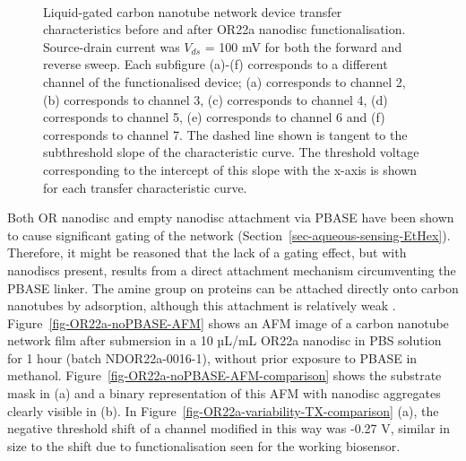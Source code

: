 \documentclass[
  a4paper,
]{scrbook}
\begin{document}
\begin{figure}
\begin{minipage}[t]{0.45\linewidth}
{{}

}

\end{minipage}%
%
\begin{minipage}[t]{0.01\linewidth}

{\centering 

~

}

\end{minipage}%

\caption{\label{fig-OR22a-variability-TX}Liquid-gated carbon nanotube
network device transfer characteristics before and after OR22a nanodisc
functionalisation. Source-drain current was \(V_{ds}\) = 100 mV for both
the forward and reverse sweep. Each subfigure (a)-(f) corresponds to a
different channel of the functionalised device; (a) corresponds to
channel 2, (b) corresponds to channel 3, (c) corresponds to channel 4,
(d) corresponds to channel 5, (e) corresponds to channel 6 and (f)
corresponds to channel 7. The dashed line shown is tangent to the
subthreshold slope of the characteristic curve. The threshold voltage
corresponding to the intercept of this slope with the x-axis is shown
for each transfer characteristic curve.}

\end{figure}

Both OR nanodisc and empty nanodisc attachment via PBASE have been shown
to cause significant gating of the network
(Section~\ref{sec-aqueous-sensing-EtHex}). Therefore, it might be
reasoned that the lack of a gating effect, but with nanodiscs present,
results from a direct attachment mechanism circumventing the PBASE
linker. The amine group on proteins can be attached directly onto carbon
nanotubes by adsorption, although this attachment is relatively weak
\autocite{Bradley2004}. Figure~\ref{fig-OR22a-noPBASE-AFM} shows an AFM
image of a carbon nanotube network film after submersion in a 10 µL/mL
OR22a nanodisc in PBS solution for 1 hour (batch NDOR22a-0016-1),
without prior exposure to PBASE in methanol.
Figure~\ref{fig-OR22a-noPBASE-AFM-comparison} shows the substrate mask
in (a) and a binary representation of this AFM with nanodisc aggregates
clearly visible in (b). In
Figure~\ref{fig-OR22a-variability-TX-comparison} (a), the negative
threshold shift of a channel modified in this way was -0.27 V, similar
in size to the shift due to functionalisation seen for the working
biosensor.
\end{document}
